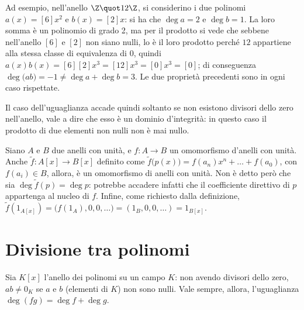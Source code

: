 Ad esempio, nell'anello $\Z\quot 12\Z$, si considerino i due polinomi $a(x)=[6]x^2$ e $b(x)=[2]x$: si ha che $\deg a=2$ e $\deg b=1$.
La loro somma è un polinomio di grado 2, ma per il prodotto si vede che sebbene nell'anello $[6]$ e $[2]$ non siano nulli, lo è il loro prodotto perché $12$ appartiene alla stessa classe di equivalenza di $0$, quindi $a(x)b(x)=[6][2]x^3=[12]x^3=[0]x^3=[0]$; di conseguenza $\deg\big(ab\big)=-1\neq\deg a+\deg b=3$.
Le due proprietà precedenti sono in ogni caso rispettate.

Il caso dell'uguaglianza accade quindi soltanto se non esistono divisori dello zero nell'anello, vale a dire che esso è un dominio d'integrità: in questo caso il prodotto di due elementi non nulli non è mai nullo.

Siano $A$ e $B$ due anelli con unità, e $f\colon A\to B$ un omomorfismo d'anelli con unità.
Anche $\tilde{f}\colon A[x]\to B[x]$ definito come $\tilde{f}\big(p(x)\big)=f(a_n)x^n+\dots+f(a_0)$, con $f(a_i)\in B$, allora, è un omomorfismo di anelli con unità.
Non è detto però che sia $\deg\tilde{f}(p)=\deg p$: potrebbe accadere infatti che il coefficiente direttivo di $p$ appartenga al nucleo di $f$.
Infine, come richiesto dalla definizione, $\tilde{f}(1_{A[x]})=\big(f(1_A),0,0,\dots\big)=(1_B,0,0,\dots)=1_{B[x]}$.

\section{Divisione tra polinomi}
Sia $K[x]$ l'anello dei polinomi su un campo $K$: non avendo divisori dello zero, $ab\neq 0_K$ se $a$ e $b$ (elementi di $K$) non sono nulli.
Vale sempre, allora, l'uguaglianza $\deg(fg)=\deg f+\deg g$.

